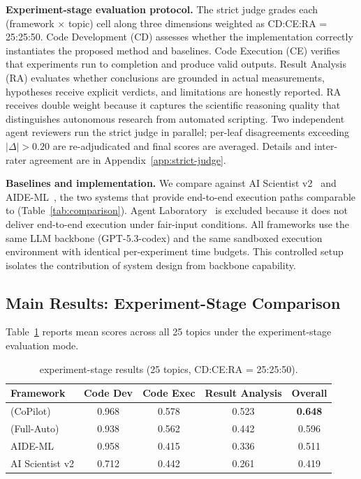\noindent \textbf{Experiment-stage evaluation protocol.} The strict judge grades each (framework $\times$ topic) cell along three dimensions weighted as CD:CE:RA = 25:25:50. Code Development (CD) assesses whether the implementation correctly instantiates the proposed method and baselines. Code Execution (CE) verifies that experiments run to completion and produce valid outputs. Result Analysis (RA) evaluates whether conclusions are grounded in actual measurements, hypotheses receive explicit verdicts, and limitations are honestly reported. RA receives double weight because it captures the scientific reasoning quality that distinguishes autonomous research from automated scripting. Two independent agent reviewers run the strict judge in parallel; per-leaf disagreements exceeding $|\Delta| > 0.20$ are re-adjudicated and final scores are averaged. Details and inter-rater agreement are in Appendix~\ref{app:strict-judge}.

\noindent \textbf{Baselines and implementation.} We compare against AI Scientist v2~\citep{yamada2025aiscientistv2} and AIDE-ML~\citep{aide2025}, the two systems that provide end-to-end execution paths comparable to \system{} (Table~\ref{tab:comparison}). Agent Laboratory~\citep{schmidgall2025agentlab} is excluded because it does not deliver end-to-end execution under fair-input conditions. All frameworks use the same LLM backbone (GPT-5.3-codex) and the same sandboxed execution environment with identical per-experiment time budgets. This controlled setup isolates the contribution of system design from backbone capability.

\vspace{-0.3em}
\subsection{Main Results: Experiment-Stage Comparison}
\label{sec:arcbench}
\vspace{-0.3em}

Table~\ref{tab:arcbench-aggregate} reports mean scores across all 25 topics under the experiment-stage evaluation mode.


\begin{table}[t]
\centering
\caption{\bench{} experiment-stage results (25 topics, CD:CE:RA = 25:25:50).}
\label{tab:arcbench-aggregate}
\small
\begin{tabular*}{\textwidth}{@{\extracolsep{\fill}}lcccc@{}}
\toprule
\textbf{Framework} & \textbf{Code Dev} & \textbf{Code Exec}
  & \textbf{Result Analysis} & \textbf{Overall} \\
\midrule
\system{} (CoPilot)   & 0.968 & 0.578 & 0.523 & \textbf{0.648} \\
\system{} (Full-Auto) & 0.938 & 0.562 & 0.442 & 0.596 \\
AIDE-ML               & 0.958 & 0.415 & 0.336 & 0.511 \\
AI Scientist v2       & 0.712 & 0.442 & 0.261 & 0.419 \\
\bottomrule
\end{tabular*}
\end{table}


